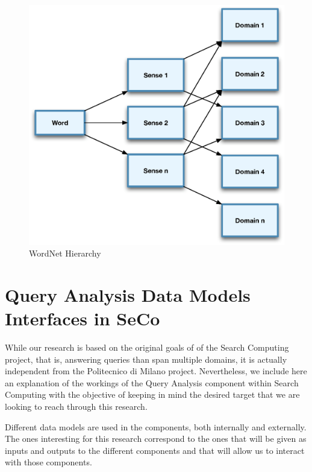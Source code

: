 \begin{figure}[ht!]
  \begin{center}
    \includegraphics[width=\linewidth]{images/wordnethierarchy}
  \end{center}
  \caption{WordNet Hierarchy}\label{fig:wordnethierarchy}
\end{figure}



\section{Query Analysis Data Models \amper Interfaces in SeCo} %
\label{sec:data_models}

While our research is based on the original goals of of the Search Computing project, that is, answering queries than span multiple domains, it is actually independent from the Politecnico di Milano project. Nevertheless, we include here an explanation of the workings of the Query Analysis component within Search Computing with the objective of keeping in mind the desired target that we are looking to reach through this research.

Different data models are used in the components, both internally and externally. The ones interesting for this research correspond to the ones that will be given as inputs and outputs to the different components and that will allow us to interact with those components.


